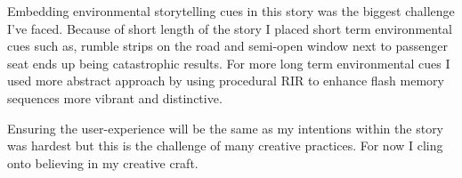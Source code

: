         Embedding environmental storytelling cues in this story was the biggest challenge I've faced. Because of short length of the story I placed short term environmental cues such as, rumble strips on the road and semi-open window next to passenger seat ends up being catastrophic results. For more long term environmental cues I used more abstract approach by using procedural RIR to enhance flash memory sequences more vibrant and distinctive.\par

        Ensuring the user-experience will be the same as my intentions within the story was hardest but this is the challenge of many creative practices. For now I cling onto believing in my creative craft.\par